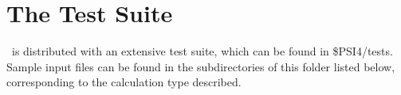 \section{The Test Suite}

\PSIfour\ is distributed with an extensive test suite, which can be found in \$PSI4/tests.  Sample input files can be found in the subdirectories of this folder listed below, corresponding to the calculation type described.


